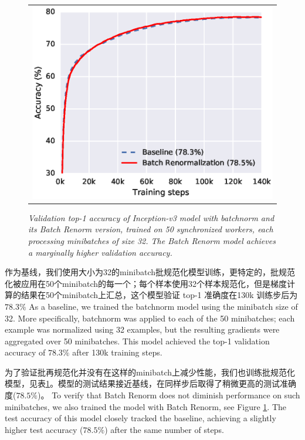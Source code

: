 \begin{figure}
    \centering
    \begin{tabular}{@{}c@{}}
\includegraphics[width=\columnwidth]{baseline.eps}
\end{tabular}
    \caption{\em 分别使用批规范化和批再规范化的 Inception-v3 模型的验证 top-1 准确度（validation top-1 accuracy），模型是在 50 个同步的工作器（worker）上训练的，其中每一个工作器处理大小为 32 的 minibatch。使用批再规范化的模型实现了略高一点的验证准确度。
    }
    \caption{\em Validation top-1 accuracy of Inception-v3 model with batchnorm and its Batch Renorm version, trained on 50 synchronized workers, each processing minibatches of size 32. The Batch Renorm model achieves a marginally higher validation accuracy.
    }
    \label{fig-baseline}
\end{figure}

作为基线，我们使用大小为32的minibatch批规范化模型训练，更特定的，批规范化被应用在50个minibatch的每一个；每个样本使用32个样本规范化，但是梯度计算的结果在50个minibatch上汇总，这个模型验证 top-1 准确度在130k 训练步后为$78.3\%$
As a baseline, we trained the batchnorm model using the minibatch size of 32. More specifically, batchnorm was applied to each of the 50 minibatches; each example was normalized using 32 examples, but the resulting gradients were aggregated over 50 minibatches. This model achieved the top-1 validation accuracy of $78.3\%$ after 130k training steps.

为了验证批再规范化并没有在这样的minibatch上减少性能，我们也训练批规范化模型，见表\ref{fig-baseline}。模型的测试结果接近基线，在同样步后取得了稍微更高的测试准确度($78.5\%$)。
To verify that Batch Renorm does not diminish performance on such minibatches, we also trained the model with Batch Renorm, see Figure \ref{fig-baseline}. The test accuracy of this model closely tracked the baseline, achieving a slightly higher test accuracy ($78.5\%$) after the same number of steps.

